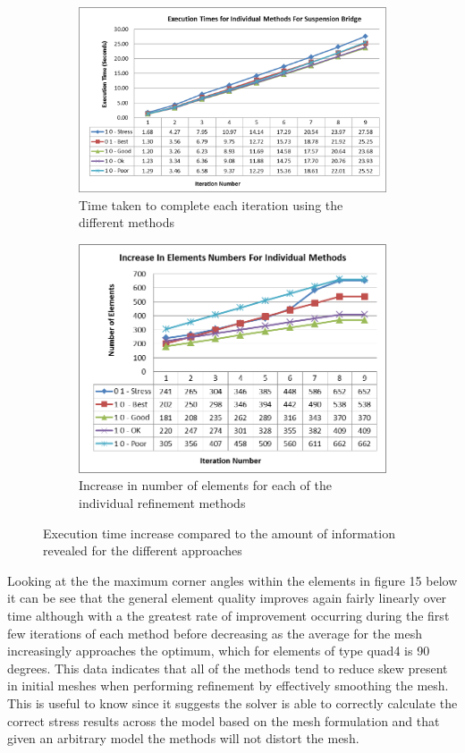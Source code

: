 \begin{figure}[H]
\centering
\begin{subfigure}{.5\textwidth}
  \centering
  \includegraphics[width=0.9\linewidth]{../Graphics/Graphs/SingleMethods/ExecutionTimes.png}
  \caption{Time taken to complete each iteration using the different methods}
  \label{fig:sub1}
\end{subfigure}%
\begin{subfigure}{.5\textwidth}
  \centering
  \includegraphics[width=0.75\linewidth]{../Graphics/Graphs/SingleMethods/NumberOfElements.png}
  \caption{Increase in number of elements for each of the individual refinement methods}
  \label{fig:sub2}
\end{subfigure}
\label{fig:test}
  \caption{Execution time increase compared to the amount of information revealed for the different approaches}
 \end{figure}
 
\noindent
Looking at the the maximum corner angles within the elements in figure 15 below it can be see that the general element quality improves again fairly linearly over time although with a the greatest rate of improvement occurring during the first few iterations of each method before decreasing as the average for the mesh increasingly approaches the optimum, which for elements of type  quad4 is 90 degrees. This data indicates that all of the methods tend to reduce skew present in initial meshes when performing refinement by effectively smoothing the mesh. This is useful to know since it suggests the solver is able to correctly calculate the correct stress results across the model based on the mesh formulation and that given an arbitrary model the methods will not distort the mesh. \\ 

